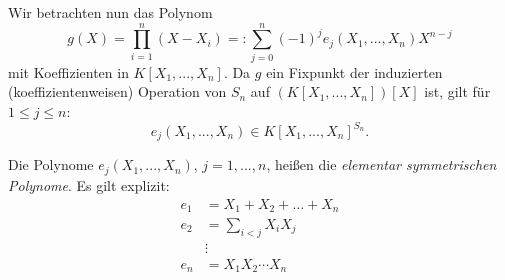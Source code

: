 \documentclass{book}
\begin{document}
Wir betrachten nun das Polynom 
\begin{equation}
    \label{eq:elsym}
    g(X) = \prod_{i =1}^n (X-X_i) =: \sum_{j = 0}^n (-1)^j e_j(X_1, ..., X_n) X^{n-j}
\end{equation}
mit Koeffizienten in $K[X_1,...,X_n]$. Da $g$ ein Fixpunkt der induzierten
(koeffizientenweisen) Operation von $S_n$ auf $(K[X_1,...,X_n])[X]$ ist, gilt für
$1 \le j \le n$:
\[
    e_j(X_1,...,X_n) \in K[X_1, ..., X_n]^{S_n}.
\]

\begin{defi}
    \label{defi:elsym}
    Die Polynome $e_j(X_1, ..., X_n)$, $j = 1, ..., n$, heißen die {\em elementar symmetrischen Polynome}. Es gilt explizit:
    \begin{align*}
        e_1 & = X_1 + X_2 + \ldots + X_n \\
        e_2 & = \sum_{i<j} X_iX_j\\
            & \vdots \\
        e_n & = X_1 X_2 \cdots X_n
    \end{align*}
\end{defi}
\end{document}
